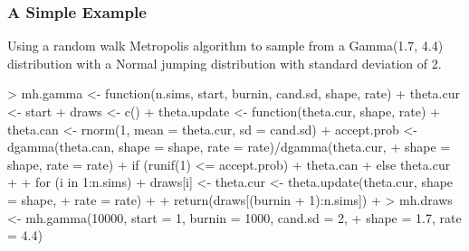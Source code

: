 \documentclass[handout]{beamer}
\begin{document}
\begin{frame}[fragile]
\frametitle{A Simple Example}
\pause
Using a random walk Metropolis algorithm to sample from a Gamma(1.7,
4.4) distribution with a Normal jumping distribution with standard
deviation of 2.
\medskip
\pause
\tiny
\begin{Schunk}
\begin{Sinput}
> mh.gamma <- function(n.sims, start, burnin, cand.sd, shape, rate) {
+     theta.cur <- start
+     draws <- c()
+     theta.update <- function(theta.cur, shape, rate) {
+         theta.can <- rnorm(1, mean = theta.cur, sd = cand.sd)
+         accept.prob <- dgamma(theta.can, shape = shape, rate = rate)/dgamma(theta.cur, 
+             shape = shape, rate = rate)
+         if (runif(1) <= accept.prob) 
+             theta.can
+         else theta.cur
+     }
+     for (i in 1:n.sims) {
+         draws[i] <- theta.cur <- theta.update(theta.cur, shape = shape, 
+             rate = rate)
+     }
+     return(draws[(burnin + 1):n.sims])
+ }
> mh.draws <- mh.gamma(10000, start = 1, burnin = 1000, cand.sd = 2, 
+     shape = 1.7, rate = 4.4)
\end{Sinput}
\end{Schunk}
\end{frame}
\end{document}

